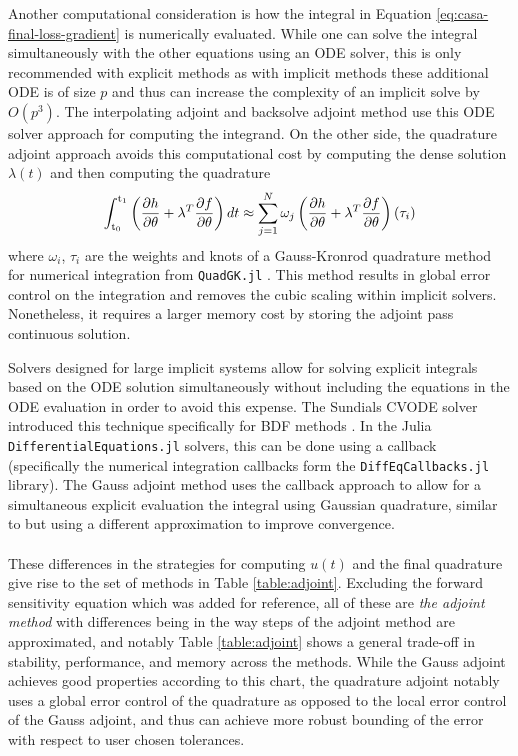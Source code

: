 Another computational consideration is how the integral in Equation \eqref{eq:casa-final-loss-gradient} is numerically evaluated. 
While one can solve the integral simultaneously with the other equations using an ODE solver, this is only recommended with explicit methods as with implicit methods these additional ODE is of size $p$ and thus can increase the complexity of an implicit solve by $O(p^3)$. 
The interpolating adjoint and backsolve adjoint method use this ODE solver approach for computing the integrand. 
On the other side, the quadrature adjoint approach avoids this computational cost by computing the dense solution $\lambda(t)$ and then computing the quadrature 
\begin{equation}
    \operatorname{\int_{t_0}^{t_1}}
    \left( \frac{\partial h}{\partial \theta} + \lambda^T \frac{\partial f}{\partial \theta} \right) dt 
    \approx
    \sum_{j=1}^N \omega_j \left( \frac{\partial h}{\partial \theta} + \lambda^T \frac{\partial f}{\partial \theta} \right) (\tau_i)
\end{equation}
where $\omega_i$, $\tau_i$ are the weights and knots of a Gauss-Kronrod quadrature method for numerical integration from \texttt{QuadGK.jl} \cite{laurie1997calculation, gonnet2012review}. 
This method results in global error control on the integration and removes the cubic scaling within implicit solvers. Nonetheless, it requires a larger memory cost by storing the adjoint pass continuous solution.

Solvers designed for large implicit systems allow for solving explicit integrals based on the ODE solution simultaneously without including the equations in the ODE evaluation in order to avoid this expense. 
The Sundials CVODE solver introduced this technique specifically for BDF methods \cite{SUNDIALS-hindmarsh2005sundials}. 
In the Julia \texttt{DifferentialEquations.jl} solvers, this can be done using a callback (specifically the numerical integration callbacks form the \texttt{DiffEqCallbacks.jl} library). 
The Gauss adjoint method uses the callback approach to allow for a simultaneous explicit evaluation the integral using Gaussian quadrature, similar to \cite{Norcliffe_gaussquadrature_2023} but using a different approximation to improve convergence.
\\ \\ 
These differences in the strategies for computing $u(t)$ and the final quadrature give rise to the set of methods in Table \ref{table:adjoint}. 
Excluding the forward sensitivity equation which was added for reference, all of these are \textit{the adjoint method} with differences being in the way steps of the adjoint method are approximated, and notably Table \ref{table:adjoint} shows a general trade-off in stability, performance, and memory across the methods. 
While the Gauss adjoint achieves good properties according to this chart, the quadrature adjoint notably uses a global error control of the quadrature as opposed to the local error control of the Gauss adjoint, and thus can achieve more robust bounding of the error with respect to user chosen tolerances.


